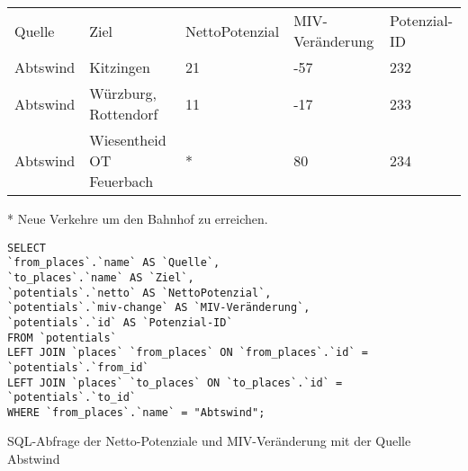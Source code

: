 \begin{tabularx}{\textwidth}{*5{X}}
Quelle & Ziel & NettoPotenzial & MIV-Veränderung & Potenzial-ID\\ 
Abtswind & Kitzingen & 21 & -57 & 232\\ 
Abtswind & Würzburg, Rottendorf & 11 & -17 & 233\\ 
Abtswind & Wiesentheid OT Feuerbach & * & 80 & 234\\ 
\end{tabularx}

\vspace{1em}

* Neue Verkehre um den Bahnhof zu erreichen.

\begin{listing}[htbp]
\begin{verbatim}
SELECT
`from_places`.`name` AS `Quelle`, 
`to_places`.`name` AS `Ziel`, 
`potentials`.`netto` AS `NettoPotenzial`, 
`potentials`.`miv-change` AS `MIV-Veränderung`, 
`potentials`.`id` AS `Potenzial-ID`
FROM `potentials`
LEFT JOIN `places` `from_places` ON `from_places`.`id` = `potentials`.`from_id`
LEFT JOIN `places` `to_places` ON `to_places`.`id` = `potentials`.`to_id`
WHERE `from_places`.`name` = "Abtswind";
\end{verbatim}
\caption{SQL-Abfrage der Netto-Potenziale und MIV-Veränderung mit der Quelle Abstwind}\label{lst-fz-abstwind}
\end{listing}